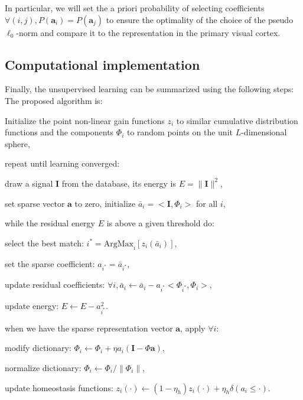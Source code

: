 \documentclass[a4paper, 11pt, draft]{article} %
\newcommand{\coef}{\mathbf{a}} %
\newcommand{\image}{\mathbf{I}} %
\newcommand{\dico}{\Phi} %
\begin{document}
In particular, we will set the a priori probability of selecting coefficients {\color{BrickRed} $\forall (i,j), P(\coef_i)=P(\coef_j)$} to ensure the optimality of the choice of the  pseudo $\ell_0$-norm and compare it to the representation in the primary visual cortex.%


\subsection{Computational implementation}
Finally, the unsupervised learning can be summarized using the following steps:
The proposed algorithm is:
\begin{enumerate}%
{\color{MidnightBlue} 
\item Initialize the point non-linear gain functions $z_i$ to similar cumulative distribution functions and the components $\dico_i$ to random points on the unit $L$-dimensional sphere,%
\item repeat until learning converged:%
\begin{enumerate}%
{\color{OliveGreen}
	\item draw a signal $\image$ from the database, its energy is $E = \| \image \|^2$,%
	\item set sparse vector $\coef$ to zero, initialize $\bar{a}_i=<\image, \dico_i >$ for all $i$,%
	\item while the residual energy $E$ is above a given threshold do:
	\begin{enumerate}
		{\color{BrickRed}
			\item select the best match: $i^\ast = \mbox{ArgMax}_{i} [z_i( \bar{a}_i )]$,%
		}
		\item set the sparse coefficient: $a_{i^\ast} = \bar{a}_{i^\ast}$,
		\item update residual coefficients: $\forall i, \bar{a}_i \leftarrow \bar{a}_i - a_{i^\ast} <\dico_{i^\ast} , \dico_i > $,%
		\item update energy: $E \leftarrow E - a_{i^\ast}^2 $.
	\end{enumerate}
}
\item when we have the sparse representation vector $\coef$, apply $\forall i$:
\begin{enumerate}
\item modify dictionary: $\dico_{i} \leftarrow \dico_{i} + \eta a_{i} (\image - \dico\coef)$,%
\item normalize dictionary: $\dico_{i} \leftarrow \dico_{i} / \| \dico_{i}\|$,%
{\color{BrickRed}
\item update homeostasis functions: $z_i( \cdot ) \leftarrow (1- \eta_h ) z_i( \cdot ) + \eta_h \delta( a_i \leq \cdot)$.%
}
\end{enumerate}
\end{enumerate}
}
\end{enumerate}
\end{document}
